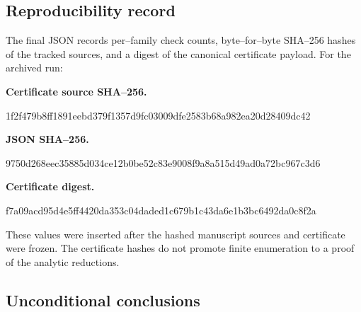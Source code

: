 \subsection{Reproducibility record}

The final JSON records per--family check counts, byte--for--byte SHA--256
hashes of the tracked sources, and a digest of the canonical certificate
payload.  For the archived run:
\begin{center}
\begin{minipage}{0.96\linewidth}
\small
\textbf{Certificate source SHA--256.}\par
{\scriptsize\ttfamily
1f2f479b8ff1891eebd379f1357d9fc03009dfe2583b68a982ea20d28409dc42\par}
\smallskip
\textbf{JSON SHA--256.}\par
{\scriptsize\ttfamily
9750d268eec35885d034ce12b0be52c83e9008f9a8a515d49ad0a72bc967c3d6\par}
\smallskip
\textbf{Certificate digest.}\par
{\scriptsize\ttfamily
f7a09acd95d4e5ff4420da353c04daded1c679b1c43da6e1b3bc6492da0c8f2a\par}
\end{minipage}
\end{center}
These values were inserted after the hashed manuscript sources and
certificate were frozen.  The certificate hashes do not promote finite enumeration to a
proof of the analytic reductions.

\subsection{Unconditional conclusions}

